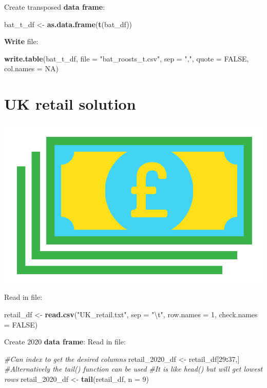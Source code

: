 \documentclass[]{book}
\newenvironment{Shaded}{\begin{snugshade}}{\end{snugshade}}
\newcommand{\KeywordTok}[1]{\textcolor[rgb]{0.13,0.29,0.53}{\textbf{#1}}}
\newcommand{\DataTypeTok}[1]{\textcolor[rgb]{0.13,0.29,0.53}{#1}}
\newcommand{\DecValTok}[1]{\textcolor[rgb]{0.00,0.00,0.81}{#1}}
\newcommand{\CharTok}[1]{\textcolor[rgb]{0.31,0.60,0.02}{#1}}
\newcommand{\StringTok}[1]{\textcolor[rgb]{0.31,0.60,0.02}{#1}}
\newcommand{\CommentTok}[1]{\textcolor[rgb]{0.56,0.35,0.01}{\textit{#1}}}
\newcommand{\OtherTok}[1]{\textcolor[rgb]{0.56,0.35,0.01}{#1}}
\newcommand{\OperatorTok}[1]{\textcolor[rgb]{0.81,0.36,0.00}{\textbf{#1}}}
\newcommand{\NormalTok}[1]{#1}
\begin{document}
Create transposed \textbf{data frame}:

\begin{Shaded}
\begin{Highlighting}[]
\NormalTok{bat_t_df <-}\StringTok{ }\KeywordTok{as.data.frame}\NormalTok{(}\KeywordTok{t}\NormalTok{(bat_df)) }
\end{Highlighting}
\end{Shaded}

\textbf{Write} file:

\begin{Shaded}
\begin{Highlighting}[]
\KeywordTok{write.table}\NormalTok{(bat_t_df, }\DataTypeTok{file =} \StringTok{"bat_roosts_t.csv"}\NormalTok{, }\DataTypeTok{sep =} \StringTok{","}\NormalTok{, }\DataTypeTok{quote =} \OtherTok{FALSE}\NormalTok{, }\DataTypeTok{col.names =} \OtherTok{NA}\NormalTok{)}
\end{Highlighting}
\end{Shaded}

\section{UK retail solution}\label{uk-retail-solution}

\begin{center}\includegraphics[width=0.2\linewidth]{figures/UKPounds} \end{center}

Read in file:

\begin{Shaded}
\begin{Highlighting}[]
\NormalTok{retail_df <-}\StringTok{ }\KeywordTok{read.csv}\NormalTok{(}\StringTok{"UK_retail.txt"}\NormalTok{, }\DataTypeTok{sep =} \StringTok{"}\CharTok{\textbackslash{}t}\StringTok{"}\NormalTok{, }\DataTypeTok{row.names =} \DecValTok{1}\NormalTok{, }\DataTypeTok{check.names =} \OtherTok{FALSE}\NormalTok{)}
\end{Highlighting}
\end{Shaded}

Create 2020 \textbf{data frame}: Read in file:

\begin{Shaded}
\begin{Highlighting}[]
\CommentTok{#Can index to get the desired columns}
\NormalTok{retail_2020_df <-}\StringTok{ }\NormalTok{retail_df[}\DecValTok{29}\OperatorTok{:}\DecValTok{37}\NormalTok{,]}
\CommentTok{#Alternatively the tail() function can be used}
\CommentTok{#It is like head() but will get lowest rows}
\NormalTok{retail_2020_df <-}\StringTok{ }\KeywordTok{tail}\NormalTok{(retail_df, }\DataTypeTok{n =} \DecValTok{9}\NormalTok{)}
\end{Highlighting}
\end{Shaded}
\end{document}

